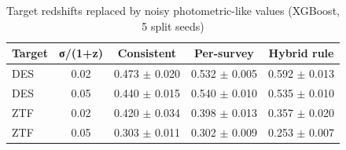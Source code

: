 \begin{table}
\centering
\caption{Target redshifts replaced by noisy photometric-like values (XGBoost, 5 split seeds)}
\begin{tabular}{lcccc}
\hline
Target & σ/(1+z) & Consistent & Per-survey & Hybrid rule \\
\hline
DES & 0.02 & 0.473 $\pm$ 0.020 & 0.532 $\pm$ 0.005 & 0.592 $\pm$ 0.013 \\
DES & 0.05 & 0.440 $\pm$ 0.015 & 0.540 $\pm$ 0.010 & 0.535 $\pm$ 0.010 \\
ZTF & 0.02 & 0.420 $\pm$ 0.034 & 0.398 $\pm$ 0.013 & 0.357 $\pm$ 0.020 \\
ZTF & 0.05 & 0.303 $\pm$ 0.011 & 0.302 $\pm$ 0.009 & 0.253 $\pm$ 0.007 \\
\hline
\end{tabular}
\end{table}
